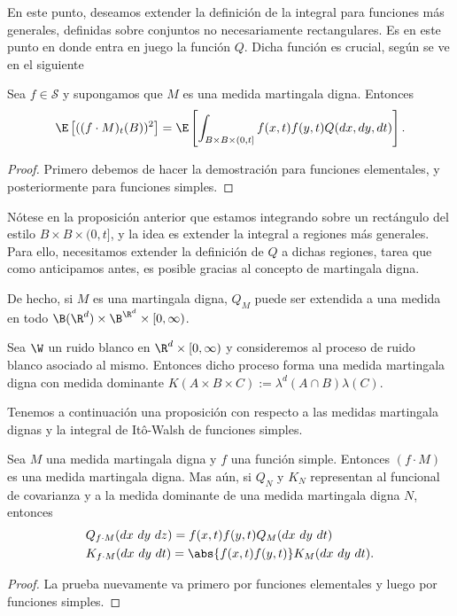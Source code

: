 En este punto, deseamos extender la definición de la integral para funciones más generales, definidas sobre conjuntos no necesariamente rectangulares. Es en este punto en donde entra en juego la función $Q$.  Dicha función es crucial, según se ve en el siguiente 

\begin{prop} 
Sea $f\in \mathscr{S}$ y supongamos que $M$ es una medida martingala digna. Entonces 
\[
\E\left[((f\cdot M)_t(B))^2\right]=\E\left[\int_{B\times B\times (0,t]}f(x,t)f(y,t)Q(dx,dy,dt)\right].   
\]
\end{prop}

\begin{proof} 
   Primero debemos de hacer la demostración para funciones elementales, y posteriormente para funciones simples.
 \end{proof}
Nótese en la proposición anterior que estamos integrando sobre un rectángulo del estilo $B\times B\times (0,t]$, y la idea es extender la integral a regiones más generales. Para ello, necesitamos extender la definición de $Q$ a dichas regiones, tarea que como anticipamos antes, es posible gracias al concepto de martingala digna.

De hecho, si $M$ es una martingala digna, $Q_M$ puede ser extendida a una medida en todo $\B(\R^{d})\times \B^{\R^{d}}\times [0,\infty)$. 

\begin{ejem} 
Sea $\W$ un ruido blanco en $\R^{d}\times[0,\infty)$ y consideremos al proceso de ruido blanco asociado al mismo. Entonces dicho proceso forma una medida martingala digna con medida dominante $K(A\times B \times C):=\lambda^{d}(A\cap B)\lambda(C)$.
\end{ejem}

Tenemos a continuación una proposición con respecto a las medidas martingala dignas y la integral de Itô-Walsh de funciones simples.

\begin{prop} 
Sea $M$ una medida martingala digna y $f$ una función simple. Entonces $(f\cdot M)$ es una medida martingala digna. 
Mas aún, si $Q_N$ y $K_N$ representan al funcional de covarianza y a la medida dominante de una medida martingala digna $N$, entonces 
\begin{align*}
   &Q_{f\cdot M}(dx \ dy \ dz)=f(x,t)f(y,t)Q_M(dx \ dy \ dt)\\
   &K_{f\cdot M}(dx \ dy \ dt)=\abs{f(x,t)f(y,t)}K_M(dx \ dy \ dt). 
\end{align*}
\end{prop}
\begin{proof} 
  La prueba nuevamente va primero por funciones elementales y luego por funciones simples. 
 \end{proof}

